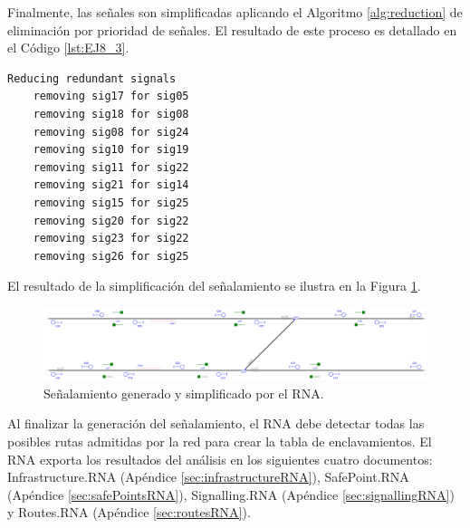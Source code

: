	Finalmente, las señales son simplificadas aplicando el Algoritmo \ref{alg:reduction} de eliminación por prioridad de señales. El resultado de este proceso es detallado en el Código \ref{lst:EJ8_3}.
	
	\begin{lstlisting}[language = {}, caption = Reducción de señalamiento por prioridad de señales, label = {lst:EJ8_3}]
	Reducing redundant signals
	removing sig17 for sig05
	removing sig18 for sig08
	removing sig08 for sig24
	removing sig10 for sig19
	removing sig11 for sig22
	removing sig21 for sig14
	removing sig15 for sig25
	removing sig20 for sig22
	removing sig23 for sig22
	removing sig26 for sig25
	\end{lstlisting}
	
	El resultado de la simplificación del señalamiento se ilustra en la Figura \ref{fig:EJ8_7}.
	
	\begin{figure}[H]
		\centering
		\includegraphics[width=1\textwidth]{resultados-obtenidos/ejemplo8/images/8_RNA.png}
		\centering\caption{Señalamiento generado y simplificado por el RNA.}
		\label{fig:EJ8_7}
	\end{figure}
	
	Al finalizar la generación del señalamiento, el RNA debe detectar todas las posibles rutas admitidas por la red para crear la tabla de enclavamientos. El RNA exporta los resultados del análisis en los siguientes cuatro documentos: Infrastructure.RNA (Apéndice \ref{sec:infrastructureRNA}), SafePoint.RNA (Apéndice \ref{sec:safePointsRNA}), Signalling.RNA (Apéndice \ref{sec:signallingRNA}) y Routes.RNA (Apéndice \ref{sec:routesRNA}).	